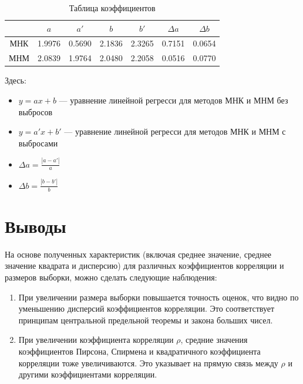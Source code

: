 \documentclass[12pt,a4paper]{article}
\begin{document}
	\clearpage

	\begin{table}[htbp]
		\centering
		\begin{tabular}{ |c|c|c|c|c|c|c| }
			\hline
			& \( a \)  & \( a' \) & \( b \) & \( b' \) & \( \Delta a \) & \( \Delta b \) \\
			\hline
			МНК & 1.9976 & 0.5690 & 2.1836 & 2.3265 & 0.7151 & 0.0654 \\ \hline
			МНМ & 2.0839 & 1.9764  & 2.0480 & 2.2058 & 0.0516 & 0.0770 \\ \hline
		\end{tabular}
		\caption{Таблица коэффициентов}
	\end{table}

	Здесь:

	\begin{itemize}
		\item \( y = ax + b \) — уравнение линейной регресси для методов МНК и
			МНМ без выбросов
		\item \( y = a'x + b' \) — уравнение линейной регресси для методов МНК и
			МНМ с выбросами
		\item \( \Delta a = \frac{|a - a'|}{a} \)
		\item \( \Delta b = \frac{|b - b'|}{b} \)
	\end{itemize}

	\clearpage

	\section{Выводы}

	На основе полученных характеристик (включая среднее значение, среднее
	значение квадрата и дисперсию) для различных коэффициентов корреляции и
	размеров выборки, можно сделать следующие наблюдения:

	\begin{enumerate}
		\item При увеличении размера выборки повышается точность оценок, что
		видно по уменьшению дисперсий коэффициентов корреляции. Это
		соответствует принципам центральной предельной теоремы и закона
		больших чисел.
		\item При увеличении коэффициента корреляции \( \rho \), средние
		значения коэффициентов Пирсона, Спирмена и квадратичного коэффициента
		корреляции тоже увеличиваются. Это указывает на прямую связь между
		\( \rho \) и другими коэффициентами корреляции.
	\end{enumerate}
\end{document}
